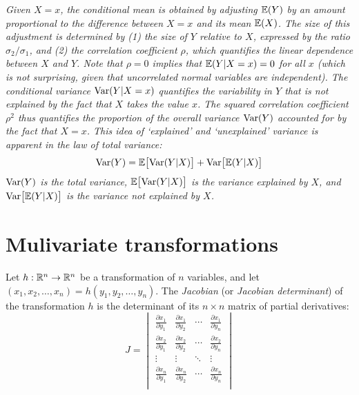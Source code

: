 \begin{remark}
\bit
\it
Given $X=x$, the conditional mean is obtained by adjusting $\mathbb{E}(Y)$ by an amount proportional to the difference between $X=x$ and its mean $\mathbb{E}(X)$. The size of this adjustment is determined by (1) the size of $Y$ relative to $X$, expressed by the ratio $\sigma_2/\sigma_1$, and (2) the correlation coefficient $\rho$, which quantifies the linear dependence between $X$ and $Y$. Note that $\rho=0$ implies that $\mathbb{E}(Y|X=x)=0$ for all $x$ (which is not surprising, given that uncorrelated normal variables are independent).
\it 
The conditional variance $\text{Var}(Y|X=x)$ quantifies the variability in $Y$ that is \emph{not} explained by the fact that $X$ takes the value $x$. The squared correlation coefficient $\rho^2$ thus quantifies the proportion of the overall variance $\text{Var}(Y)$ accounted for by the fact that $X=x$. 
\it
This idea of `explained' and `unexplained' variance is apparent in the law of total variance:
\[
\text{Var}(Y) = \mathbb{E}\big[\text{Var}(Y|X)\big] + \text{Var}\big[\mathbb{E}(Y|X)\big] 
\]
	\bit
	\it $\text{Var}(Y)$ is the total variance,
	\it $\mathbb{E}\big[\text{Var}(Y|X)\big]$ is the variance explained by $X$, and 
	\it $\text{Var}\big[\mathbb{E}(Y|X)\big]$ is the variance not explained by $X$. 
	\eit
\eit
\end{remark}

\section{Mulivariate transformations}

\begin{definition}\label{def:jacobian}
Let $h:\mathbb{R}^n\to\mathbb{R}^n$ be a transformation of $n$ variables, and let $(x_1,x_2,\ldots,x_n) = h(y_1,y_2,\ldots,y_n)$. The \emph{Jacobian} (or \emph{Jacobian determinant}) of the transformation $h$ is the determinant of its $n\times n$ matrix of partial derivatives:
\[
J = 
\begin{vmatrix}
\displaystyle\frac{\partial x_1}{\partial y_1} & \displaystyle\frac{\partial x_1}{\partial y_2} & \cdots &  \displaystyle\frac{\partial x_1}{\partial y_n}\\[2ex]
\displaystyle\frac{\partial x_2}{\partial y_1} & \displaystyle\frac{\partial x_2}{\partial y_2} & \cdots &  \displaystyle\frac{\partial x_2}{\partial y_n}\\[2ex]
\vdots & \vdots & \ddots & \vdots \\[2ex]
\displaystyle\frac{\partial x_n}{\partial y_1} & \displaystyle\frac{\partial x_n}{\partial y_2} & \cdots &  \displaystyle\frac{\partial x_n}{\partial y_n}\\[2ex]
\end{vmatrix}
\]
\end{definition}

